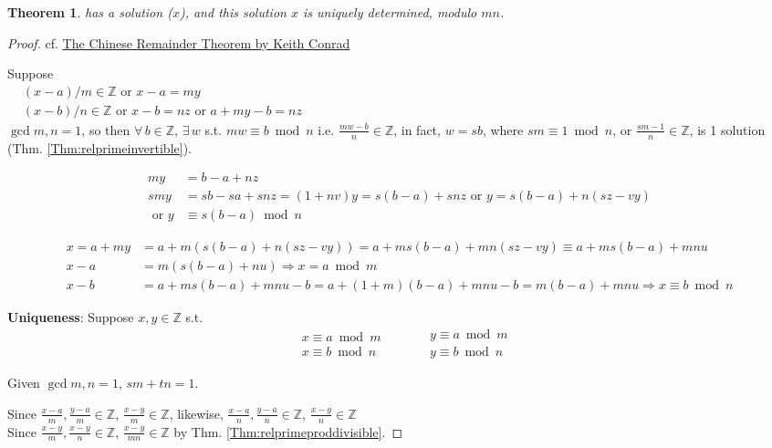 \documentclass[10pt]{amsart}
\newtheorem{theorem}{Theorem}
\begin{document}
\begin{multicols*}{2}
\begin{theorem}
 has a solution ($x$), and this solution $x$ is uniquely determined, modulo $mn$.  
\end{theorem}


\begin{proof}
cf. \href{http://www.math.uconn.edu/~kconrad/blurbs/ugradnumthy/crt.pdf}{The Chinese Remainder Theorem by Keith Conrad}


Suppose  \\
$
\begin{aligned}
& (x-a) / m \in \mathbb{Z} \text{ or } x - a = my \\ 
& (x-b)/n \in \mathbb{Z} \text{ or } x-b= nz \text{ or } a + my - b = nz 
\end{aligned}
$ \\
$\gcd{m,n}  =1$, so then $\forall \, b \in \mathbb{Z}$, $\exists \, w$ s.t. $mw \equiv b \bmod{n}$ i.e. $\frac{mw-b}{n} \in \mathbb{Z}$, in fact, $w=sb$, where $sm \equiv 1\bmod{n}$, or $\frac{sm-1}{n} \in \mathbb{Z}$, is 1 solution (Thm. \ref{Thm:relprimeinvertible}).  

\[
\begin{aligned}
my & = b-a+nz \\
smy & = sb - sa + snz = (1+nv) y = s(b-a) + snz \text{ or } y = s(b-a) + n(sz-vy) \\
\text{ or } y & \equiv s(b-a) \bmod{n}  
\end{aligned}\]

\[
\begin{aligned}
x = a+my & = a+m(s(b-a) + n(sz-vy)) = a+ ms(b-a) + mn(sz-vy) \equiv a+ms(b-a) + mnu \\ 
x-a & = m(s(b-a) + nu) \Longrightarrow x = a\bmod{m} \\
x-b & = a+ms(b-a) + mnu -b = a+(1+m)(b-a) + mnu -b = m(b-a) + mnu \Longrightarrow x \equiv b\bmod{n}
\end{aligned}
\]

\textbf{Uniqueness}:  
Suppose $x,y \in \mathbb{Z}$ s.t. 
\[
\begin{aligned} 
& x \equiv a \bmod{m} \\
& x \equiv b \bmod{n} \end{aligned} \qquad \  
\begin{aligned} 
& y \equiv a \bmod{m} \\
& y \equiv b \bmod{n} \end{aligned}
\]

Given $\gcd{m,n}=1$, $sm+tn=1$.  

Since $\frac{x-a}{m}, \frac{y-a}{m} \in \mathbb{Z}$, $\frac{x-y}{m} \in \mathbb{Z}$, likewise, $\frac{x-a}{n}, \frac{y-a}{n} \in \mathbb{Z}$, $\frac{x-y}{n} \in \mathbb{Z}$ \\
Since $\frac{x-y}{m}, \frac{x-y}{n} \in \mathbb{Z}$, $\frac{x-y}{mn} \in \mathbb{Z}$ by Thm. \ref{Thm:relprimeproddivisible}.  


\end{proof}
\end{multicols*}
\end{document}
